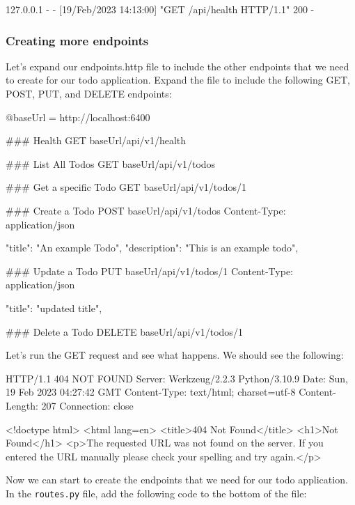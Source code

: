 \documentclass{csse4400}
\begin{document}
\begin{code}[language=bash,numbers=none]{}
  127.0.0.1 - - [19/Feb/2023 14:13:00] "GET /api/health HTTP/1.1" 200 -
\end{code}

\subsubsection{Creating more endpoints}

Let's expand our endpoints.http file to include the other endpoints that we need to create for our todo application. Expand the file to include the following GET, POST, PUT, and DELETE endpoints:

\begin{code}[numbers=none]{}
  @baseUrl = http://localhost:6400

  ### Health
  GET {{baseUrl}}/api/v1/health
  
  ### List All Todos
  GET {{baseUrl}}/api/v1/todos
  
  ### Get a specific Todo
  GET {{baseUrl}}/api/v1/todos/1
  
  ### Create a Todo
  POST {{baseUrl}}/api/v1/todos
  Content-Type: application/json
  
  {
      "title": "An example Todo",
      "description": "This is an example todo",
  }
  
  ### Update a Todo
  PUT {{baseUrl}}/api/v1/todos/1
  Content-Type: application/json
  
  {
      "title": "updated title",
  }
  
  ### Delete a Todo
  DELETE {{baseUrl}}/api/v1/todos/1
  
\end{code}

Let's run the GET request and see what happens. We should see the following:

\begin{code}[language=html,numbers=none]{}
  HTTP/1.1 404 NOT FOUND
  Server: Werkzeug/2.2.3 Python/3.10.9
  Date: Sun, 19 Feb 2023 04:27:42 GMT
  Content-Type: text/html; charset=utf-8
  Content-Length: 207
  Connection: close
  
  <!doctype html>
  <html lang=en>
  <title>404 Not Found</title>
  <h1>Not Found</h1>
  <p>The requested URL was not found on the server. If you entered the URL manually please check your spelling and try again.</p>  
\end{code}

Now we can start to create the endpoints that we need for our todo application. In the \texttt{routes.py} file, add the following code to the bottom of the file:
\end{document}
